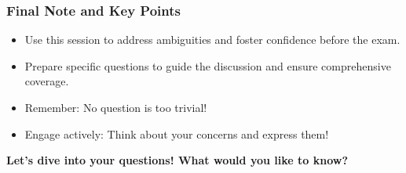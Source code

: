 \documentclass[aspectratio=169]{beamer}
\begin{document}
\begin{frame}[fragile]
    \frametitle{Final Note and Key Points}
    \begin{itemize}
        \item Use this session to address ambiguities and foster confidence before the exam.
        \item Prepare specific questions to guide the discussion and ensure comprehensive coverage.
        \item Remember: No question is too trivial!
        \item Engage actively: Think about your concerns and express them!
    \end{itemize}
    \centering
    \textbf{Let’s dive into your questions! What would you like to know?}
\end{frame}
\end{document}
